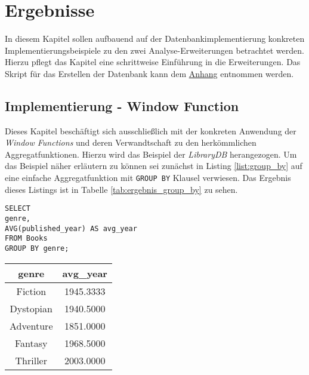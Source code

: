 \chapter{Ergebnisse}
\label{chap:ergebnis} In diesem Kapitel sollen aufbauend auf der Datenbankimplementierung
konkreten Implementierungsbeispiele zu den zwei Analyse-Erweiterungen betrachtet
werden. Hierzu pflegt das Kapitel eine schrittweise Einführung in die
Erweiterungen. Das Skript für das Erstellen der Datenbank kann dem \hyperref[sec:library_db]{Anhang}
entnommen werden.

\section{Implementierung - Window Function}
\label{sec:window_function} Dieses Kapitel beschäftigt sich ausschließlich mit der
konkreten Anwendung der \textit{Window Functions} und deren Verwandtschaft zu
den herkömmlichen Aggregatfunktionen. Hierzu wird das Beispiel der \textit{LibraryDB}
herangezogen. Um das Beispiel näher erläutern zu können sei zunächst in Listing \ref{list:group_by} auf eine einfache
Aggregatfunktion mit \texttt{GROUP BY} Klausel verwiesen. Das Ergebnis dieses Listings
ist in Tabelle \ref{tab:ergebnis_group_by} zu sehen.

\begin{minipage}{0.55\textwidth}
	\begin{lstlisting}
SELECT
genre,
AVG(published_year) AS avg_year
FROM Books
GROUP BY genre;
	\end{lstlisting}
\end{minipage}
\hfill
\begin{minipage}{0.45\textwidth}
	\centering
	\begin{tabular}{|c|c|}
		\hline
		\textbf{genre} & \textbf{avg\_year} \\
		\hline
		Fiction        & 1945.3333          \\
		\hline
		Dystopian      & 1940.5000          \\
		\hline
		Adventure      & 1851.0000          \\
		\hline
		Fantasy        & 1968.5000          \\
		\hline
		Thriller       & 2003.0000          \\
		\hline
	\end{tabular}
	 \label{tab:ergebnis_group_by}
\end{minipage}

